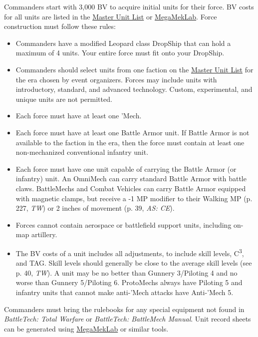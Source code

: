 Commanders start with 3,000 BV to acquire initial units for their force.
BV costs for all units are listed in the \href{http://www.masterunitlist.info}{Master Unit List} or \href{https://megamek.org}{MegaMekLab}.
Force construction must follow these rules:

\begin{itemize}

\item Commanders have a modified Leopard class DropShip that can hold a maximum of 4 units.
Your entire force must fit onto your DropShip.

\item Commanders should select units from one faction on the \href{http://www.masterunitlist.info/}{Master Unit List} for the era chosen by event organizers.
Forces may include units with introductory, standard, and advanced technology.
Custom, experimental, and unique units are not permitted.

\item Each force must have at least one 'Mech.

\item Each force must have at least one Battle Armor unit.
If Battle Armor is not available to the faction in the era, then the force must contain at least one non-mechanized conventional infantry unit.

\item Each force must have one unit capable of carrying the Battle Armor (or infantry) unit.
An OmniMech can carry standard Battle Armor with battle claws.
BattleMechs and Combat Vehicles can carry Battle Armor equipped with magnetic clamps, but receive a -1 MP modifier to their Walking MP (p. 227, \emph{TW}) or 2 inches of movement (p. 39, \emph{AS: CE}).

\item Forces cannot contain aerospace or battlefield support units, including on-map artillery.

\item The BV costs of a unit includes all adjustments, to include skill levels, C\textsuperscript{3}, and TAG.
Skill levels should generally be close to the average skill levels (see p. 40, \emph{TW}).
A unit may be no better than Gunnery 3/Piloting 4 and no worse than Gunnery 5/Piloting 6.
ProtoMechs always have Piloting 5 and infantry units that cannot make anti-'Mech attacks have Anti-'Mech 5.

\end{itemize}

Commanders must bring the rulebooks for any special equipment not found in \emph{BattleTech: Total Warfare} or \emph{BattleTech: BattleMech Manual}.
Unit record sheets can be generated using \href{https://megamek.org}{MegaMekLab} or similar tools.

